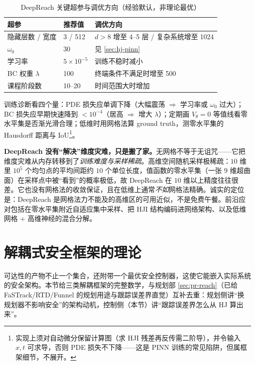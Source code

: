 \begin{table}[H]\centering\small
\caption{DeepReach 关键超参与调优方向（经验默认，非理论最优）}
\label{tab:hj-deepreach-hyper}
\begin{tabular}{lll}
\toprule
超参 & 推荐值 & 调优方向 \\
\midrule
隐藏层数 / 宽度 & 3 / 512 & $d>8$ 增至 4--5 层 / 复杂系统增至 1024 \\
$\omega_0$ & 30 & 见 \cref{sec:hj-pinn} \\
学习率 & $5\times10^{-5}$ & 训练不稳时减小 \\
BC 权重 $\lambda$ & 100 & 终端条件不满足时增至 500 \\
课程阶段数 & 10--20 & 时间范围大时增加 \\
\bottomrule
\end{tabular}
\end{table}

训练诊断看四个量：PDE 损失应单调下降（大幅震荡 $\Rightarrow$ 学习率或 $\omega_0$ 过大）；BC 损失应早期快速降到 $<10^{-4}$（居高 $\Rightarrow$ 增大 $\lambda$）；定期画 $V_\theta=0$ 等值线看零水平集是否渐光滑合理；低维时用网格法算 ground truth，测零水平集的 Hausdorff 距离与 IoU\footnote{实现上须对自动微分保留计算图（求 HJI 残差再反传需二阶导），并令输入 $x,t$ 可求导，否则 PDE 损失不下降——这是 PINN 训练的常见陷阱，但属框架细节，不展开。}。

\begin{remark}
\textbf{DeepReach 没有“解决”维度灾难，只是搬了家。}\;无网格不等于无诅咒——它把维度灾难从内存转移到了\emph{训练难度与采样稀疏}。高维空间随机采样极稀疏：$10$ 维里 $10^5$ 个均匀点的平均间距约 $10$ 个单位长度，值函数的零水平集（一张 $9$ 维超曲面）在采样点中被“看到”的概率极低，故 DeepReach 在 $10$ 维以上精度往往很差。它也没有网格法的收敛保证，且在低维上通常\emph{不如}网格法精确。诚实的定位是：DeepReach 是网格法力不能及的高维区的可用近似，不是免费午餐。前沿应对包括在零水平集附近自适应集中采样、把 HJI 结构编码进网络架构、以及低维网格 + 高维神经的混合分解。
\end{remark}

\section{解耦式安全框架的理论}
\label{sec:hj-frameworks}

可达性的产物不止一个集合，还附带一个最优安全控制器，这使它能嵌入实际系统的安全架构。本节给三类解耦框架的完整数学，与规划部 \cref{sec:pr-reach}（已给 FaSTrack/RTD/Funnel 的规划用途与跟踪误差界直觉）互补去重：规划侧讲“换规划器不影响安全”的架构动机，控制侧（本节）讲“跟踪误差界怎么从 HJ 算出来”。

